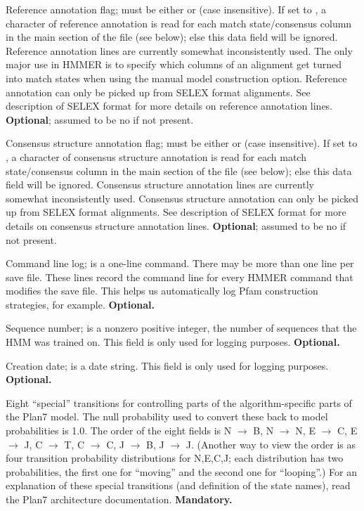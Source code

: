 \begin{wideitem}
\item [\emprog{RF    <s>}] Reference annotation flag;  must
be either  or  (case insensitive). If set to
, a character of reference annotation is read for each match
state/consensus column in the main section of the file (see below);
else this data field will be ignored.  Reference annotation lines are
currently somewhat inconsistently used. The only major use in HMMER is
to specify which columns of an alignment get turned into match states
when using the
 manual model construction option. Reference
annotation can only be picked up from SELEX format alignments. See
description of SELEX format for more details on reference annotation
lines. \textbf{Optional}; assumed to be no if not present.

\item [\emprog{CS    <s>}] Consensus structure annotation flag;
 must be either  or  (case insensitive). If set to , a character
of consensus structure annotation is read for each match
state/consensus column in the main section of the file (see below);
else this data field will be ignored. Consensus structure annotation
lines are currently somewhat inconsistently used.  Consensus structure
annotation can only be picked up from SELEX format alignments.  See
description of SELEX format for more details on consensus structure
annotation lines. \textbf{Optional}; assumed to be no if not present.

\item [\emprog{COM   <s>}] Command line log;  is a one-line
command. There may be more than one  line per save
file. These lines record the command line for every HMMER command that
modifies the save file. This helps us automatically log Pfam
construction strategies, for example. \textbf{Optional.}

\item [\emprog{NSEQ  <d>}] Sequence number;  is a nonzero
positive integer, the number of sequences that the HMM was trained on.
This field is only used for logging purposes.
\textbf{Optional.}

\item [\emprog{DATE  <s>}] Creation date;  is a date string.
This field is only used for logging purposes.
\textbf{Optional.}

\item [\emprog{XT    <d>*8}] Eight ``special'' transitions for
controlling parts of the algorithm-specific parts of the Plan7 model.
The null probability used to convert these back to model probabilities
is 1.0. The order of the eight fields is N $\rightarrow$ B, N
$\rightarrow$ N, E $\rightarrow$ C, E $\rightarrow$ J, C $\rightarrow$
T, C $\rightarrow$ C, J $\rightarrow$ B, J $\rightarrow$ J.  (Another
way to view the order is as four transition probability distributions
for N,E,C,J; each distribution has two probabilities, the first one
for ``moving'' and the second one for ``looping''.) For an explanation
of these special transitions (and definition of the state names), read
the Plan7 architecture documentation.
\textbf{Mandatory.}


\end{wideitem}
